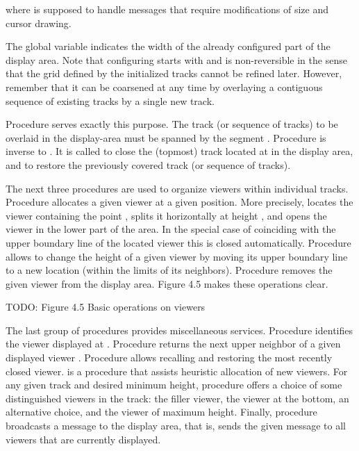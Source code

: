 \noindent where  is supposed to handle messages
that require modifications of size and cursor drawing.

The global variable  indicates the width of the already configured
part of the display area. Note that configuring starts with  and
is non-reversible in the sense that the grid defined by the
initialized tracks cannot be refined later. However, remember that it
can be coarsened at any time by overlaying a contiguous sequence of
existing tracks by a single new track.

Procedure  serves exactly this purpose. The track (or
sequence of tracks) to be overlaid in the display-area must be spanned
by the segment \code{[X, X + W)\/}. Procedure  is inverse to
. It is called to close the (topmost) track located at  in
the display area, and to restore the previously covered track (or
sequence of tracks).

The next three procedures are used to organize viewers within
individual tracks. Procedure  allocates a given viewer at a given
position. More precisely,  locates the viewer containing the point
, splits it horizontally at height , and opens the viewer  in
the lower part of the area. In the special case of  coinciding with
the upper boundary line of the located viewer this is closed
automatically. Procedure  allows to change the height of a given
viewer  by moving its upper boundary line to a new location  (within
the limits of its neighbors). Procedure  removes the given viewer
 from the display area. Figure 4.5 makes these operations clear.

TODO: Figure 4.5 Basic operations on viewers

The last group of procedures provides miscellaneous
services. Procedure  identifies the viewer displayed at .
Procedure  returns the next upper neighbor of a given
displayed viewer . Procedure  allows recalling and restoring
the most recently closed viewer.  is a procedure that assists
heuristic allocation of new viewers. For any given track and desired
minimum height, procedure  offers a choice of some distinguished
viewers in the track: the filler viewer, the viewer at the bottom, an
alternative choice, and the viewer of maximum height. Finally,
procedure  broadcasts a message to the display area, that is,
sends the given message to all viewers that are currently displayed.

